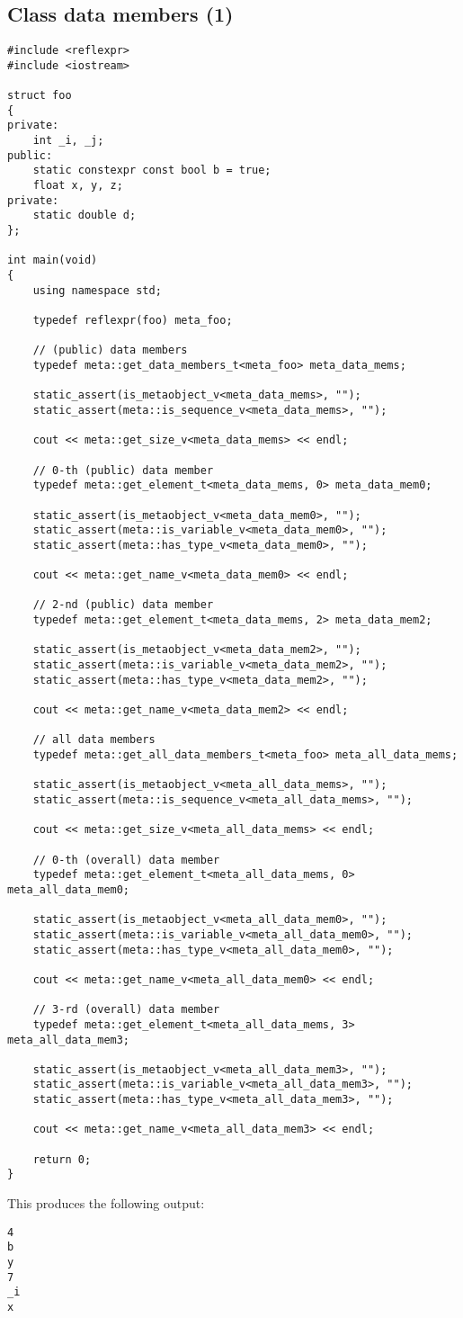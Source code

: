 \subsection{Class data members (1)}

\begin{verbatim}
#include <reflexpr>
#include <iostream>

struct foo
{
private:
	int _i, _j;
public:
	static constexpr const bool b = true;
	float x, y, z;
private:
	static double d;
};

int main(void)
{
	using namespace std;

	typedef reflexpr(foo) meta_foo;

	// (public) data members
	typedef meta::get_data_members_t<meta_foo> meta_data_mems;

	static_assert(is_metaobject_v<meta_data_mems>, "");
	static_assert(meta::is_sequence_v<meta_data_mems>, "");

	cout << meta::get_size_v<meta_data_mems> << endl;

	// 0-th (public) data member
	typedef meta::get_element_t<meta_data_mems, 0> meta_data_mem0;

	static_assert(is_metaobject_v<meta_data_mem0>, "");
	static_assert(meta::is_variable_v<meta_data_mem0>, "");
	static_assert(meta::has_type_v<meta_data_mem0>, "");

	cout << meta::get_name_v<meta_data_mem0> << endl;

	// 2-nd (public) data member
	typedef meta::get_element_t<meta_data_mems, 2> meta_data_mem2;

	static_assert(is_metaobject_v<meta_data_mem2>, "");
	static_assert(meta::is_variable_v<meta_data_mem2>, "");
	static_assert(meta::has_type_v<meta_data_mem2>, "");

	cout << meta::get_name_v<meta_data_mem2> << endl;

	// all data members
	typedef meta::get_all_data_members_t<meta_foo> meta_all_data_mems;

	static_assert(is_metaobject_v<meta_all_data_mems>, "");
	static_assert(meta::is_sequence_v<meta_all_data_mems>, "");

	cout << meta::get_size_v<meta_all_data_mems> << endl;

	// 0-th (overall) data member
	typedef meta::get_element_t<meta_all_data_mems, 0> meta_all_data_mem0;

	static_assert(is_metaobject_v<meta_all_data_mem0>, "");
	static_assert(meta::is_variable_v<meta_all_data_mem0>, "");
	static_assert(meta::has_type_v<meta_all_data_mem0>, "");

	cout << meta::get_name_v<meta_all_data_mem0> << endl;

	// 3-rd (overall) data member
	typedef meta::get_element_t<meta_all_data_mems, 3> meta_all_data_mem3;

	static_assert(is_metaobject_v<meta_all_data_mem3>, "");
	static_assert(meta::is_variable_v<meta_all_data_mem3>, "");
	static_assert(meta::has_type_v<meta_all_data_mem3>, "");

	cout << meta::get_name_v<meta_all_data_mem3> << endl;

	return 0;
}

\end{verbatim}

This produces the following output:

\begin{verbatim}
4
b
y
7
_i
x
\end{verbatim}
